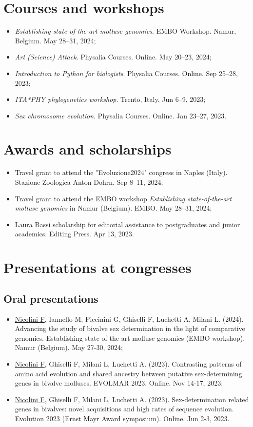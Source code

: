 \section*{Courses and workshops}
\begin{itemize}
    \item \textit{Establishing state-of-the-art mollusc genomics}. EMBO Workshop. Namur, Belgium. May 28--31, 2024;
    \item \textit{Art (Science) Attack}. Physalia Courses. Online. May 20--23, 2024;
    \item \textit{Introduction to Python for biologists}. Physalia Courses. Online. Sep 25--28, 2023;
    \item \textit{ITA*PHY phylogenetics workshop}. Trento, Italy. Jun 6--9, 2023;
    \item \textit{Sex chromosome evolution}. Physalia Courses. Online. Jan 23--27, 2023.
\end{itemize}

\section*{Awards and scholarships}
\begin{itemize}
    \item Travel grant to attend the "Evoluzione2024" congress in Naples (Italy). Stazione Zoologica Anton Dohrn. Sep 8--11, 2024;
    \item Travel grant to attend the EMBO workshop \textit{Establishing state-of-the-art mollusc genomics} in Namur (Belgium). EMBO. May 28--31, 2024;
    \item Laura Bassi scholarship for editorial assistance to postgraduates and junior academics. Editing Press. Apr 13, 2023.
\end{itemize}

\section*{Presentations at congresses}
\subsection*{Oral presentations}
\begin{itemize}
    \item \underline{Nicolini F}, Iannello M, Piccinini G, Ghiselli F, Luchetti A, Milani L. (2024). Advancing the study of bivalve sex determination in the light of comparative genomics. Establishing state-of-the-art mollusc genomics (EMBO workshop). Namur (Belgium). May 27-30, 2024;
    \item \underline{Nicolini F}, Ghiselli F, Milani L, Luchetti A. (2023). Contrasting patterns of amino acid evolution and shared ancestry between putative sex-determining genes in bivalve molluscs. EVOLMAR 2023. Online. Nov 14-17, 2023;
    \item \underline{Nicolini F}, Ghiselli F, Milani L, Luchetti A. (2023). Sex-determination related genes in bivalves: novel acquisitions and high rates of sequence evolution. Evolution 2023 (Ernst Mayr Award symposium). Online. Jun 2-3, 2023.
\end{itemize}

